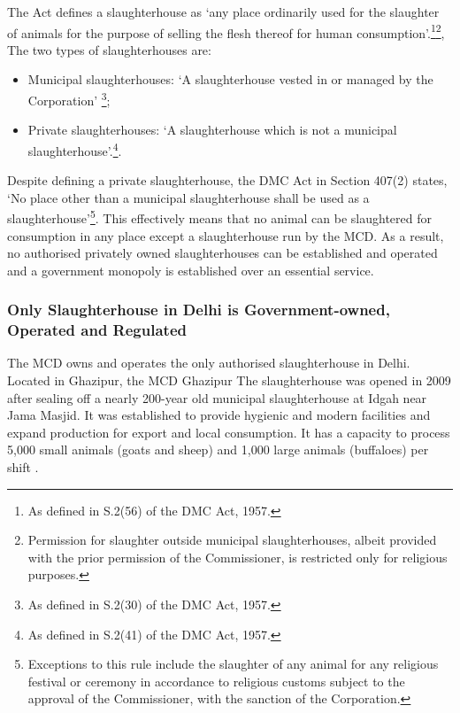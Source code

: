 \documentclass[a4paper, 12pt]{article}
\begin{document}
The Act defines a slaughterhouse as ‘any place ordinarily used for the slaughter of animals for the purpose of selling the flesh thereof for human consumption’.\footnote{ As defined in S.2(56) of the DMC Act, 1957.}\footnote{ Permission for slaughter outside municipal slaughterhouses, albeit provided with the prior permission of the Commissioner, is restricted only for religious purposes.}, The two types of slaughterhouses are:\\

\begin{itemize}
\item Municipal slaughterhouses: ‘A slaughterhouse vested in or managed by the Corporation’ \footnote{ As defined in S.2(30) of the DMC Act, 1957.};
\item Private slaughterhouses: ‘A slaughterhouse which is not a municipal slaughterhouse’.\footnote{ As defined in S.2(41) of the DMC Act, 1957.}.\\
\end{itemize}

Despite defining a private slaughterhouse, the DMC Act in Section 407(2) states, ‘No place other than a municipal slaughterhouse shall be used as a slaughterhouse’\footnote{ Exceptions to this rule include the slaughter of any animal for any religious festival or ceremony in accordance to religious customs subject to the approval of the Commissioner, with the sanction of the Corporation.}. This effectively means that no animal can be slaughtered for consumption in any place except a slaughterhouse run by the MCD. As a result, no authorised privately owned slaughterhouses can be established and operated and a government monopoly is established over an essential service. \\

\subsubsection{Only Slaughterhouse in Delhi is Government-owned, Operated and Regulated}

The MCD owns and operates the only authorised slaughterhouse in Delhi. Located in Ghazipur, the MCD Ghazipur The slaughterhouse was opened in 2009 after sealing off a nearly 200-year old municipal slaughterhouse at Idgah near Jama Masjid. It was established to provide hygienic and modern facilities and expand production for export and local consumption. It has a capacity to process 5,000 small animals (goats and sheep) and 1,000 large animals (buffaloes) per shift \parencite{bhardwajnews}.\\
\end{document}
